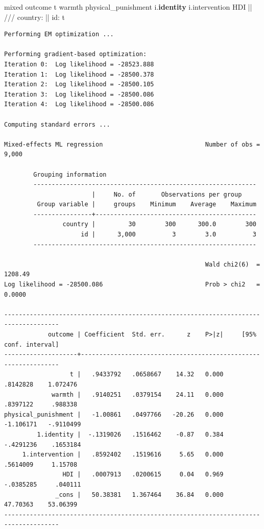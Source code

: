 \documentclass[
  letterpaper,
  DIV=11,
  numbers=noendperiod]{scrreprt}
\newenvironment{Shaded}{\begin{snugshade}}{\end{snugshade}}
\newcommand{\CommentTok}[1]{\textcolor[rgb]{0.37,0.37,0.37}{#1}}
\newcommand{\KeywordTok}[1]{\textcolor[rgb]{0.00,0.23,0.31}{\textbf{#1}}}
\newcommand{\NormalTok}[1]{\textcolor[rgb]{0.00,0.23,0.31}{#1}}
\begin{document}
\begin{Shaded}
\begin{Highlighting}[]
\NormalTok{mixed outcome t warmth physical\_punishment i.}\KeywordTok{identity}\NormalTok{ i.intervention HDI || }\CommentTok{/// }
\NormalTok{country: || id: t}
\end{Highlighting}
\end{Shaded}

\begin{verbatim}
Performing EM optimization ...

Performing gradient-based optimization: 
Iteration 0:  Log likelihood = -28523.888  
Iteration 1:  Log likelihood = -28500.378  
Iteration 2:  Log likelihood = -28500.105  
Iteration 3:  Log likelihood = -28500.086  
Iteration 4:  Log likelihood = -28500.086  

Computing standard errors ...

Mixed-effects ML regression                            Number of obs =   9,000

        Grouping information
        -------------------------------------------------------------
                        |     No. of       Observations per group
         Group variable |     groups    Minimum    Average    Maximum
        ----------------+--------------------------------------------
                country |         30        300      300.0        300
                     id |      3,000          3        3.0          3
        -------------------------------------------------------------

                                                       Wald chi2(6)  = 1208.49
Log likelihood = -28500.086                            Prob > chi2   =  0.0000

-------------------------------------------------------------------------------------
            outcome | Coefficient  Std. err.      z    P>|z|     [95% conf. interval]
--------------------+----------------------------------------------------------------
                  t |   .9433792   .0658667    14.32   0.000     .8142828    1.072476
             warmth |   .9140251   .0379154    24.11   0.000     .8397122     .988338
physical_punishment |   -1.00861   .0497766   -20.26   0.000    -1.106171   -.9110499
         1.identity |  -.1319026   .1516462    -0.87   0.384    -.4291236    .1653184
     1.intervention |   .8592402   .1519616     5.65   0.000     .5614009     1.15708
                HDI |   .0007913   .0200615     0.04   0.969    -.0385285     .040111
              _cons |   50.38381   1.367464    36.84   0.000     47.70363    53.06399
-------------------------------------------------------------------------------------


\end{verbatim}
\end{document}

